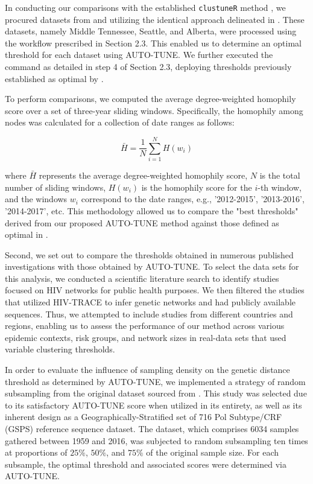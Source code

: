 \documentclass[utf8]{FrontiersinHarvard} %
\begin{document}
In conducting our comparisons with the established {\tt clustuneR} method
\citep{chato_public_2020}, we procured datasets from \citep{wolf_short_2017} and
\citep{vrancken_multi-faceted_2017} utilizing the identical approach delineated
in \cite{chato_public_2020}. These datasets, namely Middle Tennessee, Seattle,
and Alberta, were processed using the workflow prescribed in Section 2.3. This
enabled us to determine an optimal threshold for each dataset using AUTO-TUNE.
We further executed the command as detailed in step 4 of Section 2.3, deploying
thresholds previously established as optimal by \citep{chato_public_2020}.

To perform comparisons, we computed the average degree-weighted homophily score
over a set of three-year sliding windows. Specifically, the homophily among
nodes was calculated for a collection of date ranges as follows:

\begin{equation} \bar{H} = \frac{1}{N}\sum_{i=1}^{N} H(w_i) \end{equation}

where $\bar{H}$ represents the average degree-weighted homophily score, $N$ is
the total number of sliding windows, $H(w_i)$ is the homophily score for the
$i$-th window, and the windows $w_i$ correspond to the date ranges, e.g.,
'2012-2015', '2013-2016', '2014-2017', etc. This methodology allowed us to
compare the "best thresholds" derived from our proposed AUTO-TUNE method
against those defined as optimal in \citep{chato_public_2020}.

Second, we set out to compare the thresholds obtained in numerous published
investigations with those obtained by AUTO-TUNE. To select the data sets for
this analysis, we conducted a scientific literature search to identify studies
focused on HIV networks for public health purposes. We then filtered the
studies that utilized HIV-TRACE to infer genetic networks and had publicly
available sequences. Thus, we attempted to include studies from different
countries and regions, enabling us to assess the performance of our method
across various epidemic contexts, risk groups, and network sizes in real-data
sets that used variable clustering thresholds.

In order to evaluate the influence of sampling density on the genetic distance
threshold as determined by AUTO-TUNE, we implemented a strategy of random
subsampling from the original dataset sourced from \citep{rhee_national_2019}.
This study was selected due to its satisfactory AUTO-TUNE score when utilized
in its entirety, as well as its inherent design as a Geographically-Stratified
set of 716 Pol Subtype/CRF (GSPS) reference sequence dataset. The dataset,
which comprises 6034 samples gathered between 1959 and 2016, was subjected to
random subsampling ten times at proportions of $25\%$, $50\%$, and $75\%$ of
the original sample size. For each subsample, the optimal threshold and
associated scores were determined via AUTO-TUNE.
\end{document}
